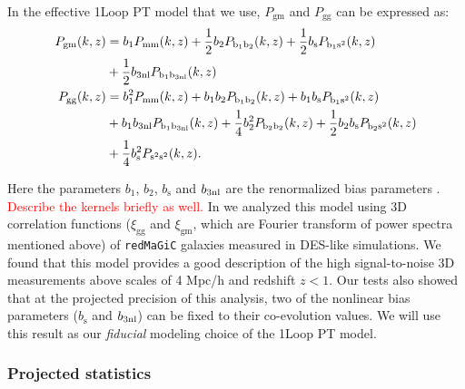 \documentclass[fleqn,usenatbib]{mnras}
\newcommand{\gammat}{\ensuremath{\gamma_{t}(\theta)}}
\newcommand{\wtheta}{\ensuremath{w(\theta)}}
\newcommand{\xigg}{\ensuremath{\xi_{\mathrm{gg}}} }
\newcommand{\xigm}{\ensuremath{\xi_{\mathrm{gm}}} }
\newcommand{\redmagic}{\texttt{redMaGiC} }
\newcommand{\red}[1]{\textcolor{red}{#1}}
\begin{document}
In the effective 1Loop PT model that we use, $P_{\mathrm{gm}}$ and $P_{\mathrm{gg}}$ can be expressed as:
\begin{align}\label{eq:P_gg_gm}
    P_{\mathrm{gm}}(k, z) &= b_1 P_{\mathrm{mm}}(k, z) +  \frac{1}{2} b_2 P_{\rm b_1 b_2}(k, z) + \frac{1}{2} b_{\mathrm{s}} P_{\rm b_1 s^2}(k, z) \nonumber  \\
    & + \frac{1}{2} b_{\rm 3nl}P_{\rm b_1 b_{\rm 3nl} }(k, z) \\
    P_{\mathrm{gg}}(k, z) &= b_1^2 P_{\mathrm{mm}}(k, z) + b_1 b_2 P_{\rm b_1 b_2}(k, z) + b_1 b_{\mathrm{s}}P_{\rm b_1 s^2}(k, z) \nonumber \\ 
    & + b_1b_{\rm 3nl} P_{\rm b_1 b_{\rm 3nl} }(k, z) + \frac{1}{4}b_2^2 P_{\rm b_2 b_2}(k, z) + \frac{1}{2} b_2 b_{\mathrm{s}}P_{\rm b_2 s^2}(k, z)  \nonumber \\ 
    & + \frac{1}{4} b^2_{\mathrm{s}} P_{\rm s^2 s^2}(k, z).  
\end{align}

Here the parameters $ b_1 $, $ b_2 $, $ b_{\mathrm{s}} $ and $ b_{\rm 3nl} $ are the renormalized bias parameters \citep{McDonald2009}. \red{Describe the kernels briefly as well.} In \cite{p2020perturbation} we analyzed this model using 3D correlation functions ($\xigg$ and $\xigm$, which are Fourier transform of power spectra mentioned above) of \redmagic galaxies measured in DES-like simulations. We found that this model provides a good description of the high signal-to-noise 3D measurements above scales of 4 Mpc/h and redshift $z < 1$. Our tests also showed that at the projected precision of this analysis, two of the nonlinear bias parameters ($ b_{\mathrm{s}} $ and $ b_{\rm 3nl} $) can be fixed to their co-evolution values. We will use this result as our \textit{fiducial} modeling choice of the 1Loop PT model. 


\subsubsection{Projected statistics}
\label{sec:proj_2pt}
\end{document}
